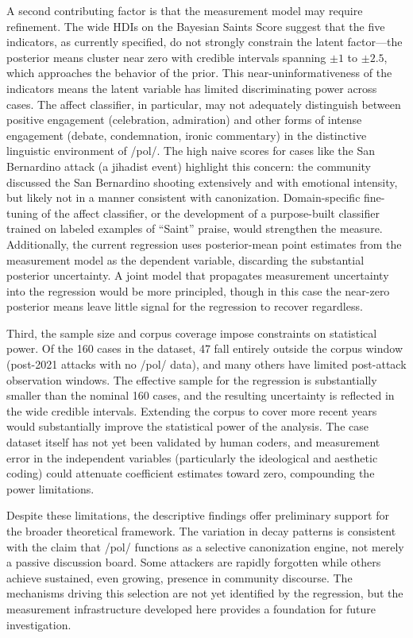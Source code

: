 \documentclass[12pt]{article}
\begin{document}
A second contributing factor is that the measurement model may require refinement. The wide HDIs on the Bayesian Saints Score suggest that the five indicators, as currently specified, do not strongly constrain the latent factor---the posterior means cluster near zero with credible intervals spanning $\pm 1$ to $\pm 2.5$, which approaches the behavior of the prior. This near-uninformativeness of the indicators means the latent variable has limited discriminating power across cases. The affect classifier, in particular, may not adequately distinguish between positive engagement (celebration, admiration) and other forms of intense engagement (debate, condemnation, ironic commentary) in the distinctive linguistic environment of /pol/. The high naive scores for cases like the San Bernardino attack (a jihadist event) highlight this concern: the community discussed the San Bernardino shooting extensively and with emotional intensity, but likely not in a manner consistent with canonization. Domain-specific fine-tuning of the affect classifier, or the development of a purpose-built classifier trained on labeled examples of ``Saint'' praise, would strengthen the measure. Additionally, the current regression uses posterior-mean point estimates from the measurement model as the dependent variable, discarding the substantial posterior uncertainty. A joint model that propagates measurement uncertainty into the regression would be more principled, though in this case the near-zero posterior means leave little signal for the regression to recover regardless.

Third, the sample size and corpus coverage impose constraints on statistical power. Of the 160 cases in the dataset, 47 fall entirely outside the corpus window (post-2021 attacks with no /pol/ data), and many others have limited post-attack observation windows. The effective sample for the regression is substantially smaller than the nominal 160 cases, and the resulting uncertainty is reflected in the wide credible intervals. Extending the corpus to cover more recent years would substantially improve the statistical power of the analysis. The case dataset itself has not yet been validated by human coders, and measurement error in the independent variables (particularly the ideological and aesthetic coding) could attenuate coefficient estimates toward zero, compounding the power limitations.

Despite these limitations, the descriptive findings offer preliminary support for the broader theoretical framework. The variation in decay patterns is consistent with the claim that /pol/ functions as a selective canonization engine, not merely a passive discussion board. Some attackers are rapidly forgotten while others achieve sustained, even growing, presence in community discourse. The mechanisms driving this selection are not yet identified by the regression, but the measurement infrastructure developed here provides a foundation for future investigation.
\end{document}
